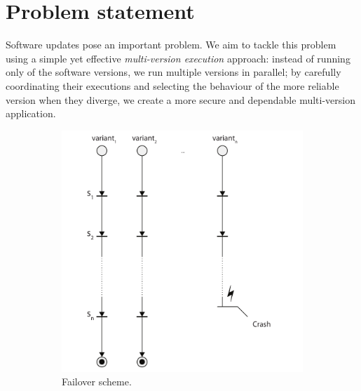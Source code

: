 \section{Problem statement}
\label{overview:problem}

Software updates pose an important problem. We aim to tackle this problem using
a simple yet effective \emph{multi-version execution} approach: instead of
running only of the software versions, we run multiple versions in parallel; by
carefully coordinating their executions and selecting the behaviour of the more
reliable version when they diverge, we create a more secure and dependable
multi-version application.

\begin{figure}[t]
  \begin{subfigure}[b]{0.5\textwidth}
    \includegraphics[width=\textwidth]{overview/figures/failover}
    \caption{Failover scheme.}
    \label{fig:failover-scheme}
  \end{subfigure}
  \quad
  \begin{subfigure}[b]{0.5\textwidth}

\end{subfigure}
\end{figure}
